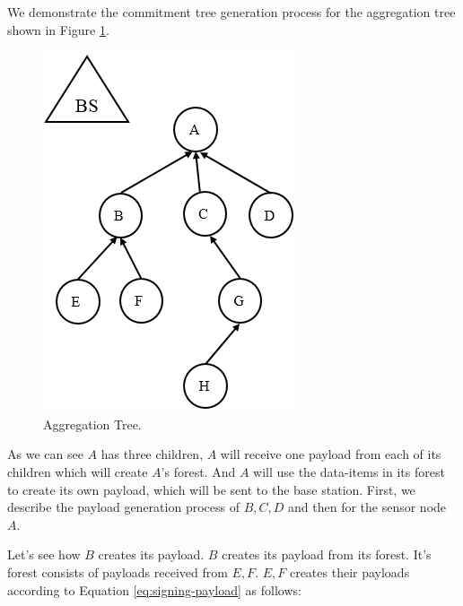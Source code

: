 	\begin{exmp} 

		We demonstrate the commitment tree generation process for the aggregation tree shown in Figure \ref{fig:Aggregation-tree-1}.
		\begin{figure}[h!]
			\centering
			\includegraphics[scale=1]{images/aggregation-tree-1.png}
			\caption{Aggregation Tree.}
			\label{fig:Aggregation-tree-1}
		\end{figure}

		As we can see $A$ has three children, $A$ will receive one payload from each of its children which will create $A$'s forest.
		And $A$ will use the data-items in its forest to create its own payload, which will be sent to the base station.
		First, we describe the payload generation process of $B,C,D$ and then for the sensor node $A$.

		Let's see how $B$ creates its payload.
		$B$ creates its payload from its forest. 
		It's forest consists of payloads received from $E,F$.
		$E,F$ creates their payloads according to Equation \ref{eq:signing-payload} as follows:


\end{exmp}
